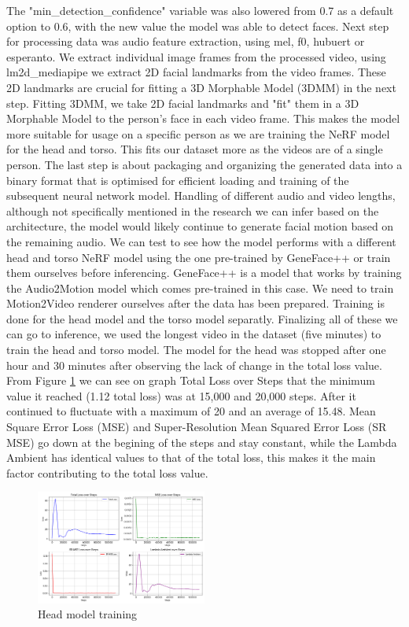 \documentclass[12pt]{article}
\begin{document}
The "min\_detection\_confidence" variable was also lowered from 0.7 as a default option to 0.6, with the new value the model was able to detect faces. Next step for processing data was audio feature extraction, using mel, f0, hubuert or esperanto. We extract individual image frames from the processed video, using lm2d\_mediapipe we extract 2D facial landmarks from the video frames. These 2D landmarks are crucial for fitting a 3D Morphable Model (3DMM) in the next step. Fitting 3DMM, we take 2D facial landmarks and "fit" them in a 3D Morphable Model to the person's face in each video frame. This makes the model more suitable for usage on a specific person as we are training the NeRF model for the head and torso. This fits our dataset more as the videos are of a single person. The last step is about packaging and organizing the generated data into a binary format that is optimised for efficient loading and training of the subsequent neural network model. Handling of different audio and video lengths, although not specifically mentioned in the research we can infer based on the architecture, the model would likely continue to generate facial motion based on the remaining audio. We can test to see how the model performs with a different head and torso NeRF model using the one pre-trained by GeneFace++ or train them ourselves before inferencing. GeneFace++ is a model that works by training the Audio2Motion model which comes pre-trained in this case. We need to train Motion2Video renderer ourselves after the data has been prepared. Training is done for the head model and the torso model separatly. Finalizing all of these we can go to inference, we used the longest video in the dataset (five minutes) to train the head and torso model. The model for the head was stopped after one hour and 30 minutes after observing the lack of change in the total loss value. From Figure \ref{img:head_model_training} we can see on graph Total Loss over Steps that the minimum value it reached (1.12 total loss) was at 15,000 and 20,000 steps. After it continued to fluctuate with a maximum of 20 and an average of 15.48. Mean Square Error Loss (MSE) and Super-Resolution Mean Squared Error Loss (SR MSE) go down at the begining of the steps and stay constant, while the Lambda Ambient has identical values to that of the total loss, this makes it the main factor contributing to the total loss value. 

\begin{figure}
    \centering
    \includegraphics[width=0.5\textwidth]{images/head_training_loss.png}
    \caption{Head model training}
    \label{img:head_model_training}
\end{figure}
\end{document}
